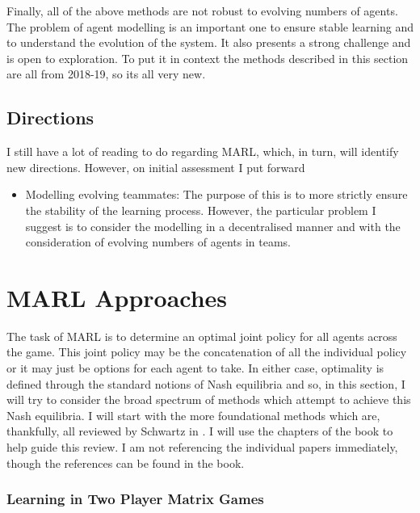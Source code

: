 \documentclass[preprint,11pt]{report}
\begin{document}
Finally, all of the above methods are not robust to evolving numbers of agents. The problem of agent
modelling is an important one to ensure stable learning and to understand the evolution of the
system. It also presents a strong challenge and is open to exploration. To put it in context the
methods described in this section are all from 2018-19, so its all very new.

\subsection{Directions}

I still have a lot of reading to do regarding MARL, which, in turn, will identify new directions.
However, on initial assessment I put forward

\begin{itemize} \item Modelling evolving teammates: The purpose of this is to more strictly ensure
the stability of the learning process. However, the particular problem I suggest is to consider the
modelling in a decentralised manner and with the consideration of evolving numbers of agents in
teams. \end{itemize}


\section{MARL Approaches} \label{sec::MARL Approaches}

The task of MARL is to determine an optimal joint policy for all agents across the game. This joint
policy may be the concatenation of all the individual policy or it may just be options for each
agent to take. In either case, optimality is defined through the standard notions of Nash equilibria
and so, in this section, I will try to consider the broad spectrum of methods which attempt to
achieve this Nash equilibria. I will start with the more foundational methods which are, thankfully,
all reviewed by Schwartz in  \cite{SchwartzMulti-agentApproach}. I will use the chapters of the book
to help guide this review. I am not referencing the individual papers immediately, though the
references can be found in the book.

\subsubsection*{Learning in Two Player Matrix Games}
\end{document}
